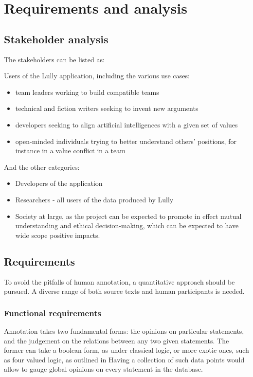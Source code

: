\documentclass{report}
\begin{document}
\chapter{Requirements and analysis}

\section{Stakeholder analysis}
The stakeholders can be listed as:

Users of the Lully application, including the various use cases:
\begin{itemize}
  \item team leaders working to build compatible teams
  \item technical and fiction writers seeking to invent new arguments
  \item developers seeking to align artificial intelligences with a given set of values 
  \item open-minded individuals trying to better understand others' positions, for instance in a value conflict in a team
\end{itemize}

And the other categories:
\begin{itemize}
  \item Developers of the application 
  \item Researchers - all users of the data produced by Lully
  \item Society at large, as the project can be expected to promote in effect mutual understanding and ethical decision-making, which can be expected to have wide scope positive impacts.
\end{itemize}

\section{Requirements}
To avoid the pitfalls of human annotation, a quantitative approach should be pursued. A diverse range of both source texts and human participants is needed. 

\subsection{Functional requirements}

Annotation takes two fundamental forms: the opinions on particular statements, and the judgement on the relations between any two given statements.
The former can  take a boolean form, as under classical logic, or more exotic ones, such as four valued logic, as outlined in  \cite{priest_many-valued_2008}
Having a collection of such data points would allow to gauge global opinions on every statement in the database.
\end{document}
